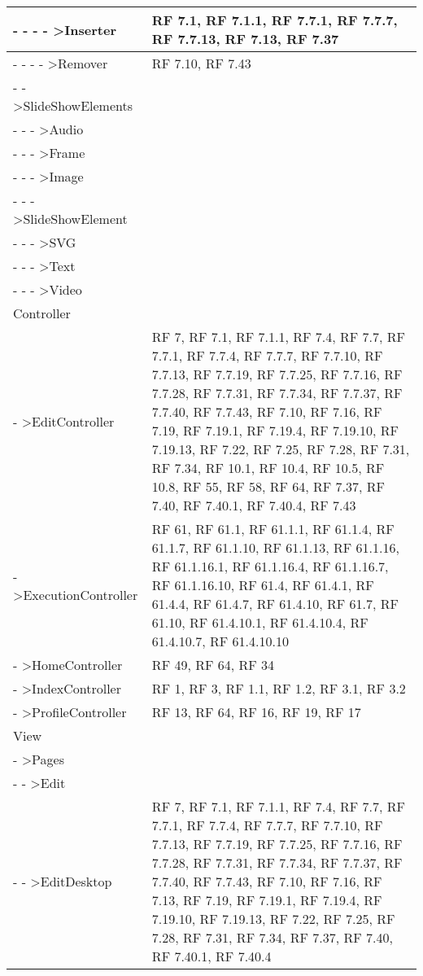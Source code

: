 {\begin{longtable} [c]{| p{8cm} | p{6cm} |}
- - - - >Inserter & RF 7.1, RF 7.1.1, RF 7.7.1, RF 7.7.7, RF 7.7.13, RF 7.13, RF 7.37\\ 
 \hline 
- - - - >Remover & RF 7.10, RF 7.43\\ 
 \hline 
- - >SlideShowElements & \\ 
 \hline 
- - - >Audio & \\ 
 \hline 
- - - >Frame & \\ 
 \hline 
- - - >Image & \\ 
 \hline 
- - - >SlideShowElement & \\ 
 \hline 
- - - >SVG & \\ 
 \hline 
- - - >Text & \\ 
 \hline 
- - - >Video & \\ 
 \hline 
Controller & \\ 
 \hline 
- >EditController & RF 7, RF 7.1, RF 7.1.1, RF 7.4, RF 7.7, RF 7.7.1, RF 7.7.4, RF 7.7.7, RF 7.7.10, RF 7.7.13, RF 7.7.19, RF 7.7.25, RF 7.7.16, RF 7.7.28, RF 7.7.31, RF 7.7.34, RF 7.7.37, RF 7.7.40, RF 7.7.43, RF 7.10, RF 7.16, RF 7.19, RF 7.19.1, RF 7.19.4, RF 7.19.10, RF 7.19.13, RF 7.22, RF 7.25, RF 7.28, RF 7.31, RF 7.34, RF 10.1, RF 10.4, RF 10.5, RF 10.8, RF 55, RF 58, RF 64, RF 7.37, RF 7.40, RF 7.40.1, RF 7.40.4, RF 7.43\\ 
 \hline 
- >ExecutionController & RF 61, RF 61.1, RF 61.1.1, RF 61.1.4, RF 61.1.7, RF 61.1.10, RF 61.1.13, RF 61.1.16, RF 61.1.16.1, RF 61.1.16.4, RF 61.1.16.7, RF 61.1.16.10, RF 61.4, RF 61.4.1, RF 61.4.4, RF 61.4.7, RF 61.4.10, RF 61.7, RF 61.10, RF 61.4.10.1, RF 61.4.10.4, RF 61.4.10.7, RF 61.4.10.10\\ 
 \hline 
- >HomeController & RF 49, RF 64, RF 34\\ 
 \hline 
- >IndexController & RF 1, RF 3, RF 1.1, RF 1.2, RF 3.1, RF 3.2\\ 
 \hline 
- >ProfileController & RF 13, RF 64, RF 16, RF 19, RF 17\\ 
 \hline 
View & \\ 
 \hline 
- >Pages & \\ 
 \hline 
- - >Edit & \\ 
 \hline 
- - >EditDesktop & RF 7, RF 7.1, RF 7.1.1, RF 7.4, RF 7.7, RF 7.7.1, RF 7.7.4, RF 7.7.7, RF 7.7.10, RF 7.7.13, RF 7.7.19, RF 7.7.25, RF 7.7.16, RF 7.7.28, RF 7.7.31, RF 7.7.34, RF 7.7.37, RF 7.7.40, RF 7.7.43, RF 7.10, RF 7.16, RF 7.13, RF 7.19, RF 7.19.1, RF 7.19.4, RF 7.19.10, RF 7.19.13, RF 7.22, RF 7.25, RF 7.28, RF 7.31, RF 7.34, RF 7.37, RF 7.40, RF 7.40.1, RF 7.40.4\\ 

\end{longtable}}
